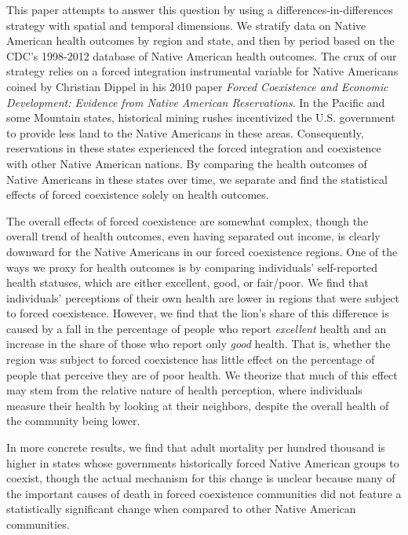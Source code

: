 \documentclass[12pt]{article}
\begin{document}
This paper attempts to answer this question by using a differences-in-differences strategy with spatial and temporal dimensions.  We stratify data on Native American health outcomes by region and state, and then by period based on the CDC’s 1998-2012 database of Native American health outcomes.  The crux of our strategy relies on a forced integration instrumental variable for Native Americans coined by Christian Dippel in his 2010 paper \emph{Forced Coexistence and Economic Development: Evidence from Native American Reservations}.  In the Pacific and some Mountain states, historical mining rushes incentivized the U.S. government to provide less land to the Native Americans in these areas.  Consequently, reservations in these states experienced the forced integration and coexistence with other Native American nations.  By comparing the health outcomes of Native Americans in these states over time, we separate and find the statistical effects of forced coexistence solely on health outcomes.

The overall effects of forced coexistence are somewhat complex, though the overall trend of health outcomes, even having separated out income, is clearly downward for the Native Americans in our forced coexistence regions. 
One of the ways we proxy for health outcomes is by comparing individuals' self-reported health statuses, which are either excellent, good, or fair/poor.
We find that individuals' perceptions of their own health are lower in regions that were subject to forced coexistence. 
However, we find that the lion's share of this difference is caused by a fall in the percentage of people who report \emph{excellent} health and an increase in the share of those who report only \emph{good} health.
That is, whether the region was subject to forced coexistence has little effect on the percentage of people that perceive they are of poor health. 
We theorize that much of this effect may stem from the relative nature of health perception, where individuals measure their health by looking at their neighbors, despite the overall health of the community being lower.

In more concrete results, we find that adult mortality per hundred thousand is higher in states whose governments historically forced Native American groups to coexist, though the actual mechanism for this change is unclear because many of the important causes of death in forced coexistence communities did not feature a statistically significant change when compared to other Native American communities.
\end{document}
